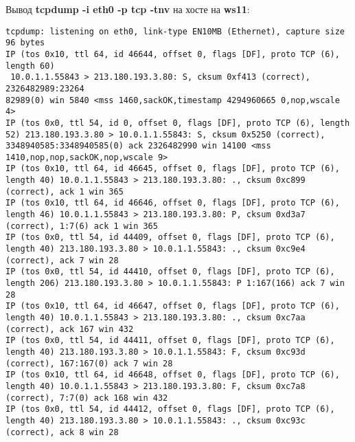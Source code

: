 \documentclass[a4paper,12pt]{article}
\begin{document}
Вывод \textbf{tcpdump -i eth0 -p tcp -tnv} на хосте на \textbf{ws11}:
\begin{Verbatim}
tcpdump: listening on eth0, link-type EN10MB (Ethernet), capture size 96 bytes
IP (tos 0x10, ttl 64, id 46644, offset 0, flags [DF], proto TCP (6), length 60)
 10.0.1.1.55843 > 213.180.193.3.80: S, cksum 0xf413 (correct), 2326482989:23264
82989(0) win 5840 <mss 1460,sackOK,timestamp 4294960665 0,nop,wscale 4>
IP (tos 0x0, ttl 54, id 0, offset 0, flags [DF], proto TCP (6), length 52) 213.180.193.3.80 > 10.0.1.1.55843: S, cksum 0x5250 (correct), 3348940585:3348940585(0) ack 2326482990 win 14100 <mss 1410,nop,nop,sackOK,nop,wscale 9>
IP (tos 0x10, ttl 64, id 46645, offset 0, flags [DF], proto TCP (6), length 40) 10.0.1.1.55843 > 213.180.193.3.80: ., cksum 0xc899 (correct), ack 1 win 365
IP (tos 0x10, ttl 64, id 46646, offset 0, flags [DF], proto TCP (6), length 46) 10.0.1.1.55843 > 213.180.193.3.80: P, cksum 0xd3a7 (correct), 1:7(6) ack 1 win 365
IP (tos 0x0, ttl 54, id 44409, offset 0, flags [DF], proto TCP (6), length 40) 213.180.193.3.80 > 10.0.1.1.55843: ., cksum 0xc9e4 (correct), ack 7 win 28
IP (tos 0x0, ttl 54, id 44410, offset 0, flags [DF], proto TCP (6), length 206) 213.180.193.3.80 > 10.0.1.1.55843: P 1:167(166) ack 7 win 28
IP (tos 0x10, ttl 64, id 46647, offset 0, flags [DF], proto TCP (6), length 40) 10.0.1.1.55843 > 213.180.193.3.80: ., cksum 0xc7aa (correct), ack 167 win 432
IP (tos 0x0, ttl 54, id 44411, offset 0, flags [DF], proto TCP (6), length 40) 213.180.193.3.80 > 10.0.1.1.55843: F, cksum 0xc93d (correct), 167:167(0) ack 7 win 28
IP (tos 0x10, ttl 64, id 46648, offset 0, flags [DF], proto TCP (6), length 40) 10.0.1.1.55843 > 213.180.193.3.80: F, cksum 0xc7a8 (correct), 7:7(0) ack 168 win 432
IP (tos 0x0, ttl 54, id 44412, offset 0, flags [DF], proto TCP (6), length 40) 213.180.193.3.80 > 10.0.1.1.55843: ., cksum 0xc93c (correct), ack 8 win 28
\end{Verbatim}
\end{document}
